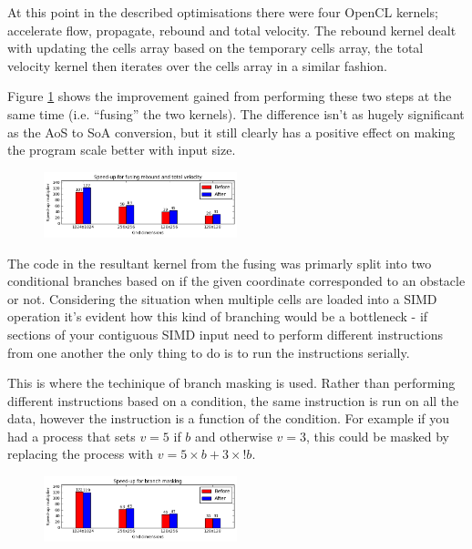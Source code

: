 \documentclass[12pt, a4paper]{article}
\begin{document}
  \begin{multicols}{2}

    At this point in the described optimisations there were four OpenCL kernels; accelerate flow, propagate, rebound and total velocity. The rebound kernel dealt with updating the cells array based on the temporary cells array, the total velocity kernel then iterates over the cells array in a similar fashion.

    Figure \ref{fusekernel} shows the improvement gained from performing these two steps at the same time (i.e. ``fusing'' the two kernels). The difference isn't as hugely significant as the AoS to SoA conversion, but it still clearly has a positive effect on making the program scale better with input size.

    \begin{figure}[H]
      \caption{} \label{fusekernel}
      \vspace{-0.8cm}
      \begin{center}
        \includegraphics[width=0.5\textwidth]{figures/fusekernel}
      \end{center}
      \vspace{-0.8cm}
    \end{figure}

    The code in the resultant kernel from the fusing was primarly split into two conditional branches based on if the given coordinate corresponded to an obstacle or not. Considering the situation when multiple cells are loaded into a SIMD operation it's evident how this kind of branching would be a bottleneck - if sections of your contiguous SIMD input need to perform different instructions from one another the only thing to do is to run the instructions serially.

    This is where the techinique of branch masking is used. Rather than performing different instructions based on a condition, the same instruction is run on all the data, however the instruction is a function of the condition. For example if you had a process that sets $v=5$ if $b$ and otherwise $v=3$, this could be masked by replacing the process with $v = 5 \times b + 3 \times !b$.

    \begin{figure}[H]
      \caption{} \label{branchmasking}
      \vspace{-0.8cm}
      \begin{center}
        \includegraphics[width=0.5\textwidth]{figures/branchmasking}
      \end{center}
      \vspace{-.8cm}
    \end{figure}


\end{multicols}
\end{document}
